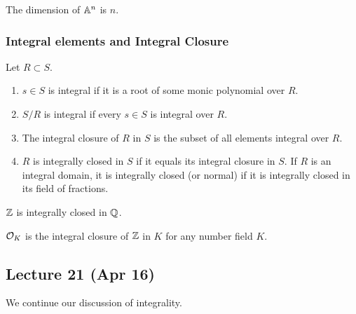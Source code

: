 \documentclass[10pt, twoside]{article}
\begin{document}
        \begin{exm}
            The dimension of $\mathbb{A}^n$ is $n$.
        \end{exm}

        \subsubsection{Integral elements and Integral Closure}
        
       
        \begin{defn}
             Let $R \subset S$.
            \begin{enumerate}
                \item $s \in S$ is integral if it is a root of some monic polynomial over $R$.
                \item $S/R$ is integral if every $s \in S$ is integral over $R$.
                \item The integral closure of $R$ in $S$ is the subset of all elements integral over $R$.
                \item $R$ is integrally closed in $S$ if it equals its integral closure in $S$. If $R$ is an integral domain, it is integrally closed (or normal) if it is integrally closed in its field of fractions.
            \end{enumerate}
        \end{defn}

        \begin{exm}
            $\mathbb{Z}$ is integrally closed in $\mathbb{Q}$.
        \end{exm}

        \begin{exm}
            $\mathcal{O}_K$ is the integral closure of $\mathbb{Z}$ in $K$ for any number field $K$.
        \end{exm}
        
        \subsection{Lecture 21 (Apr 16)}
        We continue our discussion of integrality.
\end{document}

